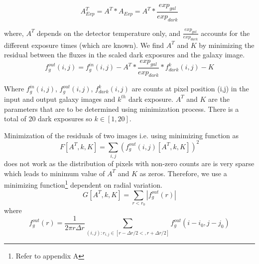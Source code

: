 \documentclass[11pt]{article}
\begin{document}
\begin{equation}
A^T_{Exp} = A^T*A_{Exp} = A^T*\frac{exp_{gal}}{exp_{dark}}
\end{equation}

where, $A^T$ depends on the detector temperature only, and $\frac{exp_{gal}}{exp_{dark}}$ accounts for the different exposure times (which are known). We find $A^T$ and $K$ by minimizing the residual between the fluxes in the scaled dark exposures and the galaxy image.  
\begin{equation}
  f_g^{out}(i,j)  = f_{g}^{in}(i,j) -  A^T*\frac{exp_{gal}}{exp_{dark}} * f_{dark}^{k}(i, j) - K
 \end{equation}

Where $f_{g}^{in}(i,j)$, $f_{g}^{out}(i,j)$, $f_{dark}^{k}(i, j)$ are counts at pixel position (i,j) in the input and output galaxy images and $k^{th}$ dark exposure. $A^T$ and $K$ are the parameters that are to be determined using minimization process. There is a total of 20 dark exposures so $k\in[1,20]$. 


Minimization of the residuals of two images i.e. using minimizing function as $$F[A^T, k, K] = \sum_{i,j}(f_{g}^{out}(i,j)[A^T, k, K])^2$$ does not work as the distribution of pixels with non-zero counts are is very sparse which leads to minimum value of $A^T$ and $K$ as zeros. Therefore, we use a minimizing function\footnote{Refer to appendix A} dependent on radial variation. 
\begin{equation}
\label{eq:min}
G[A^T, k, K] = \sum_{r<r_0} |f_g^{out}(r)|
\end{equation}
where
\begin{equation}
f_g^{out}(r) = \frac{1}{2\pi r \Delta r}\sum_{(i, j) : r_{i,j} \in [r-\Delta r/2<,r+\Delta r/2]} f_g^{out}( i-i_0, j -j_0)
\end{equation}
\end{document}
